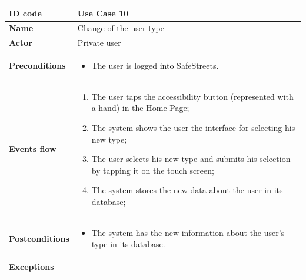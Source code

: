 \documentclass[titlepage]{article}
\begin{document}
\newpage

\begin{longtable}{| p{3 cm} | p{10 cm} |} 
\hline

\textbf{ID code} & Use Case 10 \\ \hline
\textbf{Name} & Change of the user type \\ \hline
\textbf{Actor} & Private user \\ \hline
\textbf{Preconditions} &
\begin{itemize}
\item The user is logged into SafeStreets.
\end{itemize}\\ \hline

\textbf{Events flow} &
\begin{enumerate}
\item The user taps the accessibility button (represented with a hand) in the Home Page;
\item The system shows the user the interface for selecting his new type;
\item The user selects his new type and submits his selection by tapping it on the touch screen;
\item The system stores the new data about the user in its database;
\end{enumerate} \\ \hline

\textbf{Postconditions} &
\begin{itemize}
\item The system has the new information about the user's type in its database.
\end{itemize} \\ \hline

\textbf{Exceptions} & \\ \hline




\end{longtable}


\newpage
\end{document}

